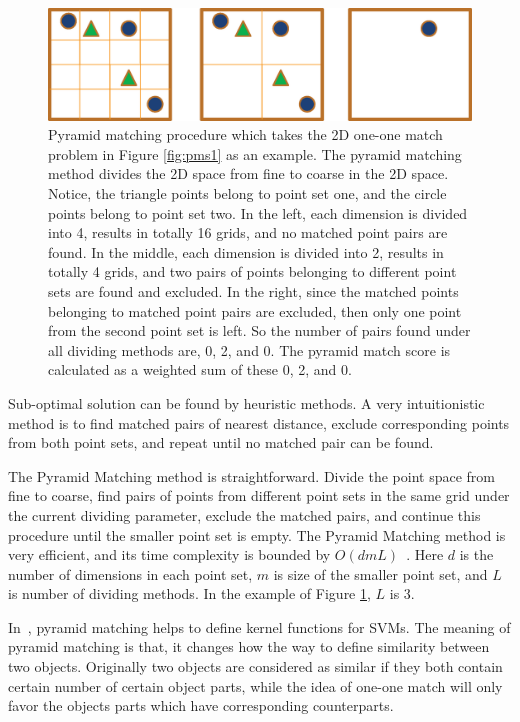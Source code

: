 \begin{figure}
\centering
\includegraphics[width=1\textwidth]{pms2.eps}
\caption[Pyramid matching procedure.]{Pyramid matching procedure which takes the 2D one-one match problem in Figure \ref{fig:pms1} as an example. The pyramid matching method divides the 2D space from fine to coarse in the 2D space. Notice, the triangle points belong to point set one, and the circle points belong to point set two. In the left, each dimension is divided into 4, results in totally 16 grids, and no matched point pairs are found. In the middle, each dimension is divided into 2, results in totally 4 grids, and two pairs of points belonging to different point sets are found and excluded. In the right, since the matched points belonging to matched point pairs are excluded, then only one point from the second point set is left. So the number of pairs found under all dividing methods are, 0, 2, and 0. The pyramid match score is calculated as a weighted sum of these 0, 2, and 0. }
\label{fig:p2}
\end{figure}




Sub-optimal solution can be found by heuristic methods. A very intuitionistic method is to find matched pairs of nearest distance, exclude corresponding points from both point sets, and repeat until no matched pair can be found.

The Pyramid Matching method is straightforward. Divide the point space from fine to coarse, find pairs of points from different point sets in the same grid under the current dividing parameter, exclude the matched pairs, and continue this procedure until the smaller point set is empty. The Pyramid Matching method is very efficient, and its time complexity is bounded by $O(dmL)$~\citep{pmk}. Here $d$ is the number of dimensions in each point set, $m$ is size of the smaller point set, and $L$ is number of dividing methods. In the example of Figure \ref{fig:p2}, $L$ is 3.

In~\citep{pmk}, pyramid matching helps to define kernel functions for SVMs. The meaning of pyramid matching is that, it changes how the way to define similarity between two objects. Originally two objects are considered as similar if they both contain certain number of certain object parts, while the idea of one-one match will only favor the objects parts which have corresponding counterparts.

